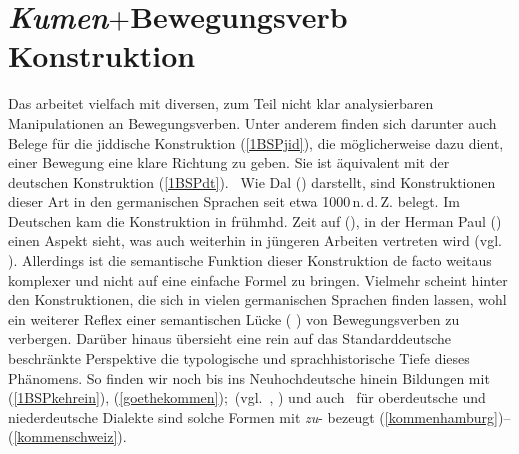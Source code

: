  \section{\textit{Kumen}$+$Bewegungsverb Konstruktion}\label{kommenzugehen}
Das  arbeitet vielfach mit diversen, zum Teil nicht klar analysierbaren Manipulationen an Bewegungsverben. Unter anderem finden sich darunter auch Belege für die jiddische Konstruktion  (\ref{1BSPjid}), die möglicherweise dazu dient, einer Bewegung eine klare Richtung zu geben. Sie ist äquivalent 
 mit der deutschen Konstruktion  (\ref{1BSPdt}). \,%
 Wie Dal (\citeyear{Dal1954}) darstellt, sind Konstruktionen dieser Art in den germanischen Sprachen seit etwa 1000\,n.\,d.\,Z. belegt. Im Deutschen kam die Konstruktion  in frühmhd. Zeit auf (\citealt[492]{Dal1954}), in der Herman Paul (\citealt[80]{Paul1919}) einen Aspekt  sieht, was auch weiterhin in jüngeren Arbeiten vertreten wird (vgl.\, \citealt{Rothstein2011,Vogel2005}). Allerdings ist die semantische Funktion dieser Konstruktion de facto weitaus komplexer und nicht auf eine einfache Formel zu bringen. Vielmehr scheint hinter den Konstruktionen, die sich in vielen germanischen Sprachen finden lassen, wohl ein weiterer Reflex einer semantischen Lücke ( \citealt{Riemsdijk2002}) von Bewegungsverben zu verbergen. Darüber hinaus übersieht eine rein auf das Standarddeutsche beschränkte Perspektive die typologische und sprachhistorische Tiefe dieses Phänomens. So finden wir noch bis ins Neuhochdeutsche hinein Bildungen mit   (\ref{1BSPkehrein}),  (\ref{goethekommen});\, (vgl.\,  \citealt{Dal1954}, \citealt[§11]{Kehrein1856}) und auch \,%
  für oberdeutsche und niederdeutsche Dialekte sind solche Formen mit \textit{zu}- bezeugt (\ref{kommenhamburg})–(\ref{kommenschweiz}).%

